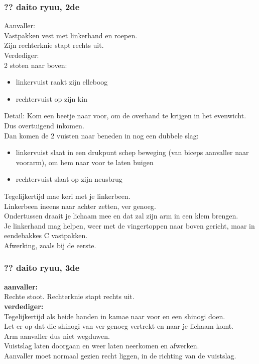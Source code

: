 \subsubsection{?? daito ryuu, 2de}
Aanvaller:\\
Vastpakken vest met linkerhand en roepen.\\
Zijn rechterknie stapt rechts uit.\\
Verdediger:\\
2 stoten naar boven:
\begin{itemize}
    \item linkervuist raakt zijn elleboog
    \item rechtervuist op zijn kin
\end{itemize}
Detail: Kom een beetje naar voor, om de overhand te krijgen in het evenwicht. Dus overtuigend inkomen.\\
Dan komen de 2 vuisten naar beneden in nog een dubbele slag:
\begin{itemize}
    \item linkervuist slaat in een drukpunt schep beweging (van biceps aanvaller naar voorarm), om hem naar voor te laten buigen
    \item rechtervuist slaat op zijn neusbrug
\end{itemize}
Tegelijkertijd mae keri met je linkerbeen.\\
Linkerbeen ineens naar achter zetten, ver genoeg.\\
Ondertussen draait je lichaam mee en dat zal zijn arm in een klem brengen.\\
Je linkerhand mag helpen, weer met de vingertoppen naar boven gericht, maar in eendebakkes C vastpakken.\\
Afwerking, zoals bij de eerste.

\subsubsection{?? daito ryuu, 3de}
\textbf{aanvaller:}\\
Rechte stoot. Rechterknie stapt rechts uit.\\
\textbf{verdediger:}\\
Tegelijkertijd als beide handen in kamae naar voor en een shinogi doen.\\
Let er op dat die shinogi van ver genoeg vertrekt en naar je lichaam komt.\\
Arm aanvaller dus niet wegduwen.\\
Vuistslag laten doorgaan en weer laten neerkomen en afwerken.\\
Aanvaller moet normaal gezien recht liggen, in de richting van de vuistslag.

